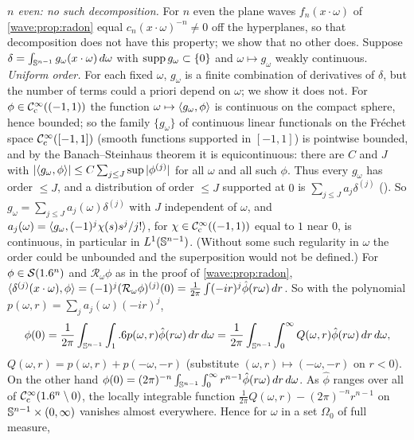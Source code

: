 \emph{$n$ even: no such decomposition.} For $n$ even the plane waves $f_n(x\cdot\omega)$ of
\cref{wave:prop:radon} equal $c_n(x\cdot\omega)^{-n}\ne0$ off the hyperplanes, so that decomposition does not
have this property; we show that no other does. Suppose
$\delta=\int_{\mathbb{S}^{n-1}}g_\omega(x\cdot\omega)\,d\omega$ with $\operatorname{supp} g_\omega\subset\{0\}$ and
$\omega\mapsto g_\omega$ weakly continuous. \emph{Uniform order.} For each fixed $\omega$, $g_\omega$ is a finite
combination of derivatives of $\delta$, but the number of terms could a priori depend on $\omega$; we show it
does not. For $\phi\in\mathcal{C}^\infty_{\mathrm{c}}((-1,1))$ the function $\omega\mapsto\langle g_\omega, \phi\rangle$ is continuous on the compact
sphere, hence bounded; so the family $\{g_\omega\}$ of continuous linear functionals on the Fr\'echet space
$\mathcal{C}^\infty_{\mathrm{c}}([-1,1])$ (smooth functions supported in $[-1,1]$) is pointwise bounded, and by the Banach--Steinhaus
theorem it is equicontinuous: there are $C$ and $J$ with
$|\langle g_\omega, \phi\rangle|\le C\sum_{j\le J}\sup|\phi^{(j)}|$ for all $\omega$ and all such $\phi$. Thus every
$g_\omega$ has order $\le J$, and a distribution of order $\le J$ supported at $0$ is
$\sum_{j\le J}a_j\delta^{(j)}$ (\cite[Theorem~2.3.4]{Hormander-I}). So
$g_\omega=\sum_{j\le J}a_j(\omega)\delta^{(j)}$ with $J$ independent of $\omega$, and
$a_j(\omega)=\langle g_\omega, (-1)^j\chi(s)s^j/j!\rangle$, for $\chi\in\mathcal{C}^\infty_{\mathrm{c}}((-1,1))$ equal to $1$ near $0$, is continuous,
in particular in $L^1(\mathbb{S}^{n-1})$. (Without some such regularity in $\omega$ the order could be unbounded
and the superposition would not be defined.) For $\phi\in\mathcal{S}(1.6^n)$ and
$\mathcal R_\omega\phi$ as in the proof of \cref{wave:prop:radon}, $\langle \delta^{(j)}(x\cdot\omega), \phi\rangle=(-1)^j(\mathcal R_\omega\phi)^{(j)}(0)
=\frac1{2\pi}\int(-ir)^j\hat\phi(r\omega)\,dr$. So with the polynomial $p(\omega,r)=\sum_ja_j(\omega)(-ir)^j$,
\begin{equation*}
  \phi(0)=\frac1{2\pi}\int_{\mathbb{S}^{n-1}}\int_1.6 p(\omega,r)\hat\phi(r\omega)\,dr\,d\omega
  =\frac1{2\pi}\int_{\mathbb{S}^{n-1}}\int_0^\infty Q(\omega,r)\hat\phi(r\omega)\,dr\,d\omega,
\end{equation*}
$Q(\omega,r)=p(\omega,r)+p(-\omega,-r)$ (substitute $(\omega,r)\mapsto(-\omega,-r)$ on $r<0$). On the other hand
$\phi(0)=(2\pi)^{-n}\int_{\mathbb{S}^{n-1}}\int_0^\infty r^{n-1}\hat\phi(r\omega)\,dr\,d\omega$. As $\hat\phi$ ranges over all of
$\mathcal{C}^\infty_{\mathrm{c}}(1.6^n\setminus0)$, the locally integrable function $\frac1{2\pi}Q(\omega,r)-(2\pi)^{-n}r^{n-1}$ on
$\mathbb{S}^{n-1}\times(0,\infty)$ vanishes almost everywhere. Hence for $\omega$ in a set $\Omega_0$ of full measure,
